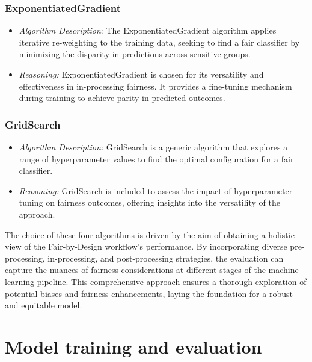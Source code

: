 \subsubsection{ExponentiatedGradient}

\begin{itemize}

    \item \emph{Algorithm Description}: The ExponentiatedGradient algorithm applies iterative re-weighting to the training data, seeking to find a fair classifier by minimizing the disparity in predictions across sensitive groups.

    \item \emph{Reasoning:} ExponentiatedGradient is chosen for its versatility and effectiveness in in-processing fairness. It provides a fine-tuning mechanism during training to achieve parity in predicted outcomes.

\end{itemize}

\subsubsection{GridSearch}

\begin{itemize}

    \item \emph{Algorithm Description:} GridSearch is a generic algorithm that explores a range of hyperparameter values to find the optimal configuration for a fair classifier.

    \item \emph{Reasoning:} GridSearch is included to assess the impact of hyperparameter tuning on fairness outcomes, offering insights into the versatility of the approach.

\end{itemize}

The choice of these four algorithms is driven by the aim of obtaining a holistic view of the Fair-by-Design workflow's performance. By incorporating diverse pre-processing, in-processing, and post-processing strategies, the evaluation can capture the nuances of fairness considerations at different stages of the machine learning pipeline. This comprehensive approach ensures a thorough exploration of potential biases and fairness enhancements, laying the foundation for a robust and equitable model.

\section{Model training and evaluation}
\label{section:val_mt_eval}

